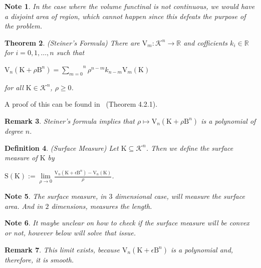 \documentclass[a4paper]{book}
\newtheorem{theorem}{Theorem}%
\newtheorem{remark}[theorem]{Remark}%
\newtheorem{note}[theorem]{Note}%
\newtheorem{definition}[theorem]{Definition}%
\numberwithin{theorem}{section}%
\begin{document}
\begin{note}
    In the case where the volume functinal is not continuous, we would have a disjoint area of region, which cannot happen since this defeats the purpose of the problem.
\end{note}

\begin{theorem}(Steiner's Formula)
    There are $\displaystyle \mathrm{V}_{m}:\mathscr{K}^{n}\to\mathbb{R}$ and cofficients $k_i\in\mathbb{R}$ for $i=0,1,\dots,n$ such that 
    \begin{center}
        $\displaystyle \mathrm{V}_{n}(\mathrm{K}+\rho\mathrm{B}^{n})=\overset{n}{\underset{m=0}{\sum}}\rho^{n-m}k_{n-m}\mathrm{V}_{m}(\mathrm{K})$
    \end{center}
    for all $\mathrm{K}\in\mathscr{K}^{n}$, $\rho\geq0$.
\end{theorem}
A proof of this can be found in~\citep{schneider2014convex} (Theorem 4.2.1).

\begin{remark}
    Steiner’s formula implies that $\rho\mapsto\mathrm{V}_{n}(\mathrm{K}+\rho\mathrm{B}^{n})$ is a polynomial of degree $n$.
\end{remark}

\begin{definition} (Surface Measure)
    Let $\mathrm{K}\subseteq\mathscr{K}^{n}$. Then we define the \textit{surface measure} of $\mathrm{K}$ by
    \begin{center}
        $\displaystyle \mathrm{S}(\mathrm{K}):=\underset{\rho\to0}{\lim}\frac{\mathrm{V}_{n}(\mathrm{K}+\epsilon\mathrm{B}^{n})-\mathrm{V}_{n}(\mathrm{K})}{\rho}$.
    \end{center}
\end{definition}

\begin{note}
    The surface measure, in $3$ dimensional case, will measure the surface area. And in $2$ dimensions, measures the length.
\end{note}

\begin{note}
    It maybe unclear on how to check if the surface measure will be convex or not, however below will solve that issue.
\end{note}

\begin{remark}
    This limit exists, because $\mathrm{V}_{n}(\mathrm{K}+\epsilon\mathrm{B}^{n})$ is a polynomial and, therefore, it is smooth.
\end{remark}
\end{document}

